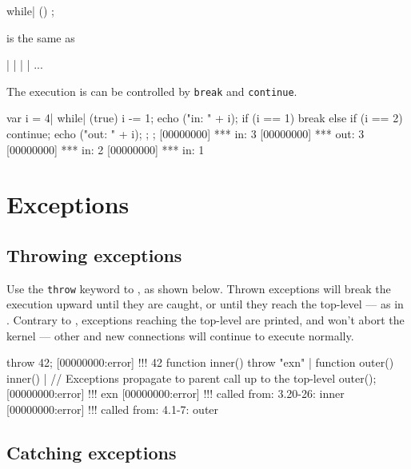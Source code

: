 \begin{urbiunchecked}
while| ()
  ;
\end{urbiunchecked}

\noindent
is the same as

\begin{urbiunchecked}
 |  |  |  | ...
\end{urbiunchecked}

The execution is can be controlled by \lstinline|break| and
\lstinline|continue|.

\begin{urbiscript}[firstnumber=last]
{
  var i = 4|
  while| (true)
  {
    i -= 1;
    echo ("in: " + i);
    if (i == 1)
      break
    else if (i == 2)
      continue;
    echo ("out: " + i);
  };
};
[00000000] *** in: 3
[00000000] *** out: 3
[00000000] *** in: 2
[00000000] *** in: 1
\end{urbiscript}


\section{Exceptions}
\label{sec:lang:except}
\subsection{Throwing exceptions}

Use the \lstinline|throw| keyword to , as shown below. Thrown exceptions will
break the execution upward until they are caught, or until they reach
the top-level --- as in \Cxx.  Contrary to \Cxx, exceptions reaching
the top-level are printed, and won't abort the kernel --- other and new
connections will continue to execute normally.

\begin{urbiscript}[firstnumber=last]
throw 42;
[00000000:error] !!! 42
function inner() { throw "exn" } |
function outer() { inner() }|
// Exceptions propagate to parent call up to the top-level
outer();
[00000000:error] !!! exn
[00000000:error] !!!    called from: 3.20-26: inner
[00000000:error] !!!    called from: 4.1-7: outer
\end{urbiscript}

\subsection{Catching exceptions}

